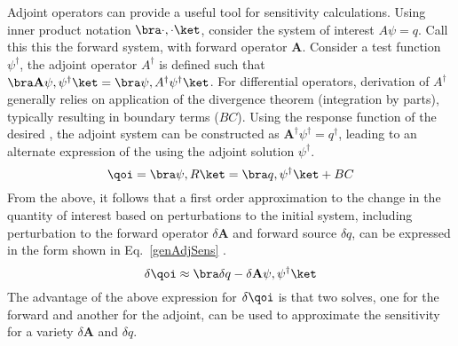 Adjoint operators can provide a useful tool for sensitivity calculations. Using inner product notation $\bra \cdot , \cdot \ket$, consider the system of interest $A \psi = q$. Call this this the forward system, with forward operator $\mathbf{A}$. Consider a test function $\psi^\dag$, the adjoint operator $A^\dag$ is defined such that $\bra \mathbf{A} \psi, \psi^\dag \ket = \bra \psi, A^\dag \psi^\dag \ket $. For differential operators, derivation of $A^\dag$ generally relies on application of the divergence theorem (integration by parts), typically resulting in boundary terms ($BC$). Using the response function of the desired \qoi, the adjoint system can be constructed as $\mathbf{A^\dag} \psi^\dag = q^\dag$, leading to an alternate expression of the \qoi using the adjoint solution $\psi^\dag $.
\begin{equation}
\label{genAdjQoI}
\qoi = \bra \psi, R \ket = \bra q , \psi^\dag \ket + BC
\end{equation} 
From the above, it follows that a first order approximation to the change in the quantity of interest based on perturbations to the initial system, including perturbation to the forward operator $\delta \mathbf{A}$ and forward source $\delta q$, can be expressed in the form shown in Eq.~\eqref{genAdjSens} \cite{Marchuk}.
\begin{equation}
\label{genAdjSens}
\delta \qoi \approx \bra \delta q - \delta \mathbf{A} \psi , \psi^\dag \ket 
\end{equation}
The advantage of the above expression for $\delta \qoi$ is that two solves, one for the forward and another for the adjoint, can be used to approximate the sensitivity for a variety $\delta \mathbf{A}$ and $\delta q$.
 

